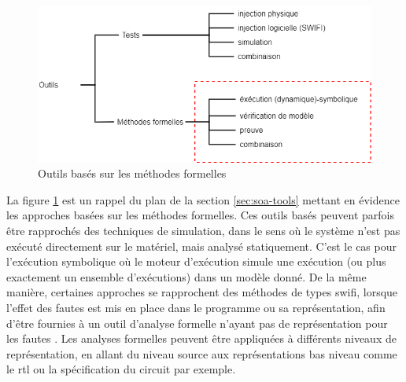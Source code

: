             \begin{figure}[hbt]\centering
              \includegraphics[scale=.45]{ch2-background/img/plan-soa-tools-formal.drawio.png}
              \caption{Outils basés sur les méthodes formelles}
              \label{fig:soa-tools-scheme-plan}
            \end{figure}
                
            La figure \ref{fig:soa-tools-scheme-plan} est un rappel du plan de la section \ref{sec:soa-tools} mettant en évidence les approches basées sur les méthodes formelles. 
            Ces outils basés peuvent parfois être rapprochés des techniques de simulation, dans le sens où le système n'est pas exécuté directement sur le matériel, mais analysé statiquement. C'est le cas pour l'exécution symbolique où le moteur d'exécution simule une exécution (ou plus exactement un ensemble d'exécutions) dans un modèle donné.
            De la même manière, certaines approches se rapprochent des méthodes de types \gls{swifi}, lorsque l'effet des fautes est mis en place dans le programme ou sa représentation, afin d'être fournies à un outil d'analyse formelle n'ayant pas de représentation pour les fautes \cite{Potet/ICST14, Le/DATE18}. 
            Les analyses formelles peuvent être appliquées à différents niveaux de représentation, en allant du niveau source aux représentations bas niveau comme le \gls{rtl} ou la spécification du circuit par exemple.             
            
